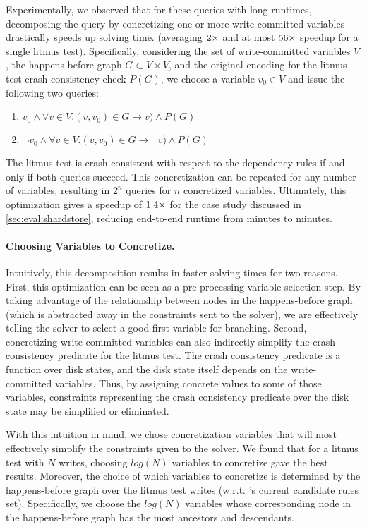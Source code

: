 Experimentally, we observed that for these queries with long runtimes,
decomposing the query by concretizing one or more write-committed variables
drastically speeds up solving time.
(averaging $2 \times$ and at most $56 \times$ speedup for a single litmus test).
Specifically, considering the set of write-committed variables $V$,
the happens-before graph $G\subset V\times V$,
and the original encoding for the litmus test crash consistency check $P(G)$,
we choose a variable $v_0\in V$ and issue the following two queries:
\begin{enumerate}
  \item $v_0 \wedge \forall v\in V. (v, v_0)\in G \rightarrow v) \wedge P(G)$
  \item $\neg v_0 \wedge \forall v\in V. (v, v_0)\in G \rightarrow \neg v) \wedge P(G)$
\end{enumerate}
The litmus test is crash consistent with respect to the dependency rules
if and only if both queries succeed.
This concretization can be repeated for any number of variables,
resulting in $2^n$ queries for $n$ concretized variables.
Ultimately, this optimization gives a speedup of $1.4 \times$
for the \shardstore case study discussed in \cref{sec:eval:shardstore},
reducing end-to-end runtime from \shardstoresynthesistime minutes to \splitvariablenewtime minutes.

\paragraph{Choosing Variables to Concretize.}
Intuitively, this decomposition results in faster solving times for two reasons.
First, this optimization can be seen as a pre-processing variable selection step.
By taking advantage of the relationship between nodes in the happens-before graph
(which is abstracted away in the constraints sent to the solver),
we are effectively telling the solver to select a good first variable for branching.
Second, concretizing write-committed variables can also indirectly simplify the
crash consistency predicate for the litmus test.
The crash consistency predicate is a function over disk states,
and the disk state itself depends on the write-committed variables.
Thus, by assigning concrete values to some of those variables,
constraints representing the crash consistency predicate over the disk state
may be simplified or eliminated.

With this intuition in mind, we chose concretization variables
that will most effectively simplify the constraints given to the solver.
We found that for a litmus test with $N$ writes,
choosing $log(N)$ variables to concretize gave the best results.
Moreover, the choice of which variables to concretize is determined by the
happens-before graph over the litmus test writes
(w.r.t. \depsynth's current candidate rules set).
Specifically, we choose the $log(N)$ variables whose corresponding
node in the happens-before graph has the most ancestors and descendants.

